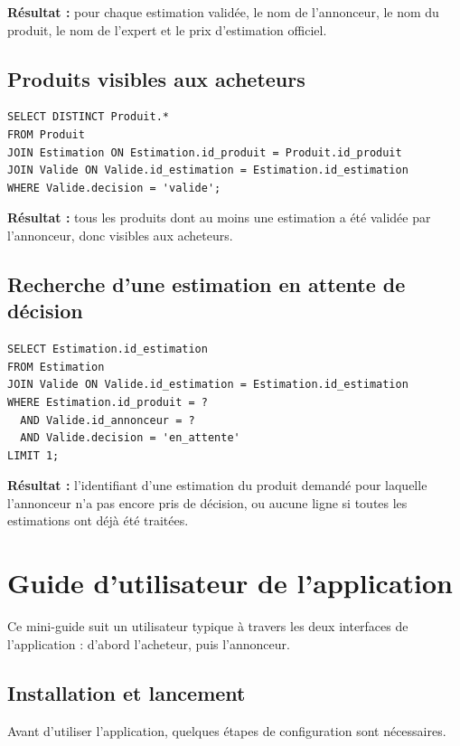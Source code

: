 \documentclass{article}
\theoremstyle{plain}
\theoremstyle{definition}
\begin{document}
\noindent\textbf{Résultat :} pour chaque estimation validée, le nom de
l'annonceur, le nom du produit, le nom de l'expert et le prix
d'estimation officiel.

\subsection*{Produits visibles aux acheteurs}

\begin{verbatim}
SELECT DISTINCT Produit.*
FROM Produit
JOIN Estimation ON Estimation.id_produit = Produit.id_produit
JOIN Valide ON Valide.id_estimation = Estimation.id_estimation
WHERE Valide.decision = 'valide';
\end{verbatim}

\noindent\textbf{Résultat :} tous les produits dont au moins une
estimation a été validée par l'annonceur, donc visibles aux acheteurs.

\subsection*{Recherche d'une estimation en attente de décision}

\begin{verbatim}
SELECT Estimation.id_estimation
FROM Estimation
JOIN Valide ON Valide.id_estimation = Estimation.id_estimation
WHERE Estimation.id_produit = ?
  AND Valide.id_annonceur = ?
  AND Valide.decision = 'en_attente'
LIMIT 1;
\end{verbatim}

\noindent\textbf{Résultat :} l'identifiant d'une estimation du produit
demandé pour laquelle l'annonceur n'a pas encore pris de décision, ou
aucune ligne si toutes les estimations ont déjà été traitées.

\pagebreak
\section*{Guide d'utilisateur de l'application}

Ce mini-guide suit un utilisateur typique à travers les deux interfaces de l'application : d'abord l'acheteur, puis l'annonceur.

\subsection*{Installation et lancement}
 
Avant d'utiliser l'application, quelques étapes de configuration sont nécessaires.
 
\end{document}
